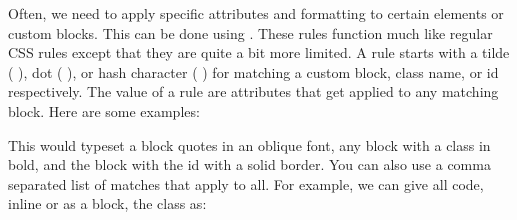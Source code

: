 \documentclass{book}
\begin{document}
\begin{mdP}[data-line={2659}]%
{}Often, we need to apply specific attributes and formatting to certain elements
or custom blocks. This can be done using %
{}%
{}. These rules
function much like regular CSS rules except that they are quite a bit more
limited. A rule starts with a tilde (%
{}\mdCode[class={code,code1}]{{\textasciitilde}}%
{}), dot (%
{}%
{}), or hash character (%
{}\mdCode[class={code,code1}]{\#}%
{})
for matching a custom block, class name, or id respectively. The value of
a rule are attributes that get applied to any matching block.
Here are some examples:
{} %
{}%
\end{mdP}%
\begin{mdPre}[class={para-block,pre-indented,language-madoko,lang-madoko,madoko,highlighted},language={madoko},data-line={2667}]%
%
\end{mdPre}%
\begin{mdP}[data-line={2671}]%
{}This would typeset a block quotes in an oblique font, any block with 
a %
{}%
{} class in bold, and the block with the %
{}%
{} id with a solid border.
You can also use a comma separated list of matches that apply to all.
For example, we can give all code, inline or as a block, the class %
{}%
{} as:%
\end{mdP}%
\end{document}
